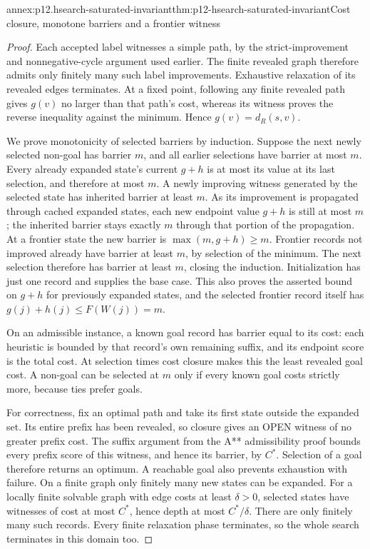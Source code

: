 \begin{annexitem}{annex:p12.hsearch-saturated-invariant}{thm:p12-hsearch-saturated-invariant}{Cost closure, monotone barriers and a frontier witness}
\begin{proof}
Each accepted label witnesses a simple path, by the strict-improvement
and nonnegative-cycle argument used earlier. The finite revealed graph
therefore admits only finitely many such label improvements. Exhaustive
relaxation of its revealed edges terminates. At a fixed point, following
any finite revealed path gives \(g(v)\) no larger than that path's
cost, whereas its witness proves the reverse inequality against the
minimum. Hence \(g(v)=d_R(s,v)\).

We prove monotonicity of selected barriers by induction. Suppose the next
newly selected non-goal has barrier \(m\), and all earlier selections
have barrier at most \(m\). Every already expanded state's current
\(g+h\) is at most its value at its last selection, and therefore
at most \(m\). A newly improving witness generated by the selected
state has inherited barrier at least \(m\). As its improvement is
propagated through cached expanded states, each new endpoint value
\(g+h\) is still at most \(m\); the inherited barrier stays
exactly \(m\) through that portion of the propagation. At a frontier
state the new barrier is \(\max(m,g+h)\ge m\). Frontier records
not improved already have barrier at least \(m\), by selection of
the minimum. The next selection therefore has barrier at least \(m\),
closing the induction. Initialization has just one record and supplies
the base case. This also proves the asserted bound on \(g+h\) for
previously expanded states, and the selected frontier record itself has
\(g(j)+h(j)\le F(W(j))=m\).

On an admissible instance, a known goal record has barrier equal to its
cost: each heuristic is bounded by that record's own remaining suffix,
and its endpoint score is the total cost. At selection times cost closure
makes this the least revealed goal cost. A non-goal can be selected at
\(m\) only if every known goal costs strictly more, because ties
prefer goals.

For correctness, fix an optimal path and take its first state outside
the expanded set. Its entire prefix has been revealed, so closure gives
an OPEN witness of no greater prefix cost. The suffix argument from
the A** admissibility proof bounds every prefix score of this witness,
and hence its barrier, by \(C^*\). Selection of a goal therefore
returns an optimum. A reachable goal also prevents exhaustion with
failure. On a finite graph only finitely many new states can be expanded.
For a locally finite solvable graph with edge costs at least
\(\delta>0\), selected states have witnesses of cost at most
\(C^*\), hence depth at most \(C^*/\delta\). There are only
finitely many such records. Every finite relaxation phase terminates,
so the whole search terminates in this domain too.
\end{proof}
\end{annexitem}

